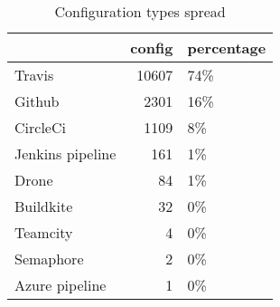 \begin {table}[!htbp]

\caption{Configuration types spread}
\label{table_config_types}
\begin{tabular}{lrl}
\hline
{} &  config & percentage \\ \hline

Travis          &   10607 &        74\% \\ \hline
Github          &    2301 &        16\% \\ \hline
CircleCi        &    1109 &         8\% \\ \hline
Jenkins pipeline &     161 &         1\% \\ \hline
Drone           &      84 &         1\% \\ \hline
Buildkite       &      32 &         0\% \\ \hline
Teamcity        &       4 &         0\% \\ \hline
Semaphore       &       2 &         0\% \\ \hline
Azure pipeline           &       1 &         0\% \\ \hline

\end{tabular}
\end{table}
